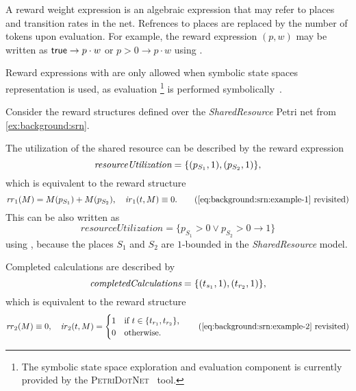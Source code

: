 A reward weight expression is an algebraic expression that may refer
to places and transition rates in the net. Refrences to places are
replaced by the number of tokens upon evaluation. For example, the
reward expression $(p, w)$ may be written as
$\textsf{true} \rightarrow p \cdot w$ or $p > 0 \rightarrow p \cdot w$ using
.

Reward expressions with  are only allowed when symbolic
state spaces representation is used, as  evaluation%
\footnote{The symbolic state space exploration and 
  evaluation component is currently provided by the
  \textsc{PetriDotNet}~\citep{Petridotnet} tool.} is performed
symbolically~\citep{TDK2010_Darvas}.

\begin{runningExample}
  Consider the reward structures defined over the
  \emph{Shared\-Resource} Petri net from \vref{ex:background:srn}.

  The utilization of the shared resource can be described by the
  reward expression
  \begin{equation}
    \textit{resourceUtilization} = \{ (p_{S_1}, 1), (p_{S_2}, 1)\} \text,
  \end{equation}
  which is equivalent to the  reward structure
  \begin{equation}
    \rateReward_1(M) = M(p_{S_1}) + M(p_{S_2}), \quad
    \impulseReward_1(t, M) \equiv 0 \text.
    \tag{\ref{eq:background:srn:example-1} revisited}
  \end{equation}
  This can be also written as
  \begin{equation}
    \textit{resourceUtilization} = \{p_{S_1} > 0 \lor p_{S_2} > 0
    \rightarrow 1\}
  \end{equation}
  using , because the places $S_1$ and $S_2$ are
  $1$-bounded in the \emph{Shared\-Resource} model.

  Completed calculations are described by
  \begin{equation}
    \textit{completedCalculations} = \{ (t_{s_1}, 1), (t_{r_2}, 1)\} \text,
  \end{equation}
  which is equivalent to the reward structure
  \begin{equation}
    \rateReward_2(M) \equiv 0, \quad \impulseReward_2(t, M) = \begin{cases}
      1 & \text{if $t \in \{t_{r_1}, t_{r_2}\}$,} \\
      0 & \text{otherwise.}
    \end{cases}
    \tag{\ref{eq:background:srn:example-2} revisited}
  \end{equation}
\end{runningExample}

